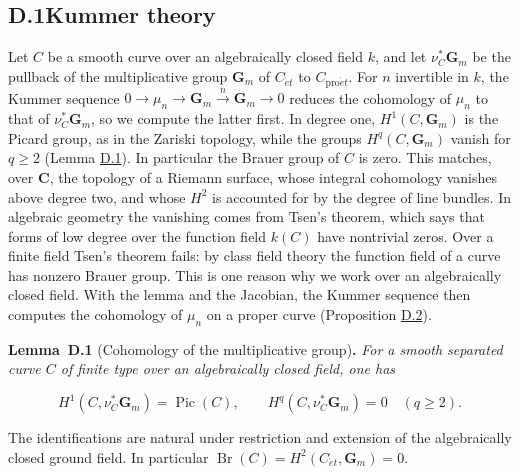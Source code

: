 \documentclass[11pt]{article}
\newenvironment{bpstatement}[2]{\par\addvspace{0.6\baselineskip}\noindent\textbf{#1}#2\textbf{.}\enspace\ignorespaces}
  {\par\addvspace{0.4\baselineskip}}
\newenvironment{bpstatementit}[2]{\begin{bpstatement}{#1}{#2}\itshape\ignorespaces}{\end{bpstatement}}
\begin{document}
\subsection*{\texorpdfstring{D.1\quad Kummer theory}{D.1 Kummer theory}}
\label{bp3}%
\label{bp4}%
Let \(C\) be a smooth curve over an algebraically closed field \(k\), and let \(\nu_C^*\mathbf G_m\) be the pullback of the multiplicative group \(\mathbf G_m\) of \(C_{\acute{e}t}\) to \(C_{\mathrm{pro}\acute{e}t}\). For \(n\) invertible in \(k\), the Kummer sequence \(0\to\mu_n\to\mathbf G_m\xrightarrow{n}\mathbf G_m\to0\) reduces the cohomology of \(\mu_n\) to that of \(\nu_C^*\mathbf G_m\), so we compute the latter first. In degree one, \(H^1(C,\mathbf G_m)\) is the Picard group, as in the Zariski topology, while the groups \(H^q(C,\mathbf G_m)\) vanish for \(q\ge2\) (Lemma \hyperref[bp5]{D.1}). In particular the Brauer group of \(C\) is zero. This matches, over \(\mathbf C\), the topology of a Riemann surface, whose integral cohomology vanishes above degree two, and whose \(H^2\) is accounted for by the degree of line bundles. In algebraic geometry the vanishing comes from Tsen's theorem, which says that forms of low degree over the function field \(k(C)\) have nontrivial zeros. Over a finite field Tsen's theorem fails: by class field theory the function field of a curve has nonzero Brauer group. This is one reason why we work over an algebraically closed field. With the lemma and the Jacobian, the Kummer sequence then computes the cohomology of \(\mu_n\) on a proper curve (Proposition \hyperref[bp8]{D.2}).

\label{bp5}%
\begin{bpstatementit}{Lemma~D.1}{ (Cohomology of the multiplicative group)}
For a smooth separated curve \(C\) of finite type over an algebraically closed field, one has

\[
H^1(C,\nu_C^*\mathbf G_m)=\operatorname{Pic}(C),
\qquad
H^q(C,\nu_C^*\mathbf G_m)=0\quad(q\geq2).
\]

The identifications are natural under restriction and extension of the algebraically closed ground field. In particular \(\operatorname{Br}(C)=H^2(C_{\acute{e}t},\mathbf G_m)=0\).
\end{bpstatementit}
\end{document}
